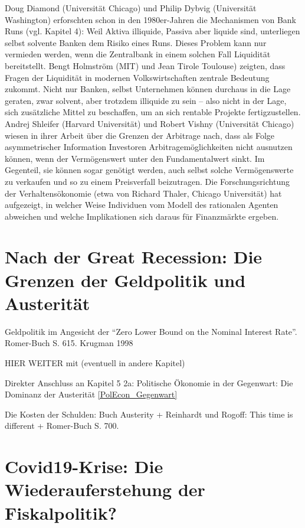 Doug
Diamond (Universität Chicago) und Philip Dybvig (Universität Washington) erforschten
schon in den 1980er-Jahren die Mechanismen von Bank Runs (vgl. Kapitel 4): Weil
Aktiva illiquide, Passiva aber liquide sind, unterliegen selbst solvente Banken dem
Risiko eines Runs. Dieses Problem kann nur vermieden werden, wenn die Zentralbank
in einem solchen Fall Liquidität bereitstellt. Bengt Holmström (MIT) und Jean Tirole
Toulouse) zeigten, dass Fragen der Liquidität in modernen Volkswirtschaften zentrale
Bedeutung zukommt. Nicht nur Banken, selbst Unternehmen können durchaus in die
Lage geraten, zwar solvent, aber trotzdem illiquide zu sein – also nicht in der Lage, sich
zusätzliche Mittel zu beschaffen, um an sich rentable Projekte fertigzustellen. Andrej
Shleifer (Harvard Universität) und Robert Vishny (Universität Chicago) wiesen in ihrer
Arbeit über die Grenzen der Arbitrage nach, dass als Folge asymmetrischer Information
Investoren Arbitragemöglichkeiten nicht ausnutzen können, wenn der Vermögenswert
unter den Fundamentalwert sinkt. Im Gegenteil, sie können sogar genötigt werden, auch
selbst solche Vermögenswerte zu verkaufen und so zu einem Preisverfall beizutragen.
Die Forschungsrichtung der Verhaltensökonomie (etwa von Richard Thaler, Chicago
Universität) hat aufgezeigt, in welcher Weise Individuen vom Modell des rationalen
Agenten abweichen und welche Implikationen sich daraus für Finanzmärkte ergeben.





\section{Nach der Great Recession: Die Grenzen der Geldpolitik und Austerität}

Geldpolitik im Angesicht der "`Zero Lower Bound on the Nominal Interest Rate"'. Romer-Buch S. 615.
Krugman 1998




HIER WEITER mit (eventuell in andere Kapitel)

Direkter Anschluss an Kapitel 5 2a: Politische Ökonomie in der Gegenwart: Die Dominanz der Austerität
\ref{PolEcon_Gegenwart}



Die Kosten der Schulden:
Buch Austerity + Reinhardt und Rogoff: This time is different + Romer-Buch S. 700.




\section{Covid19-Krise: Die Wiederauferstehung der Fiskalpolitik?}
\label{NeueFiskal}

